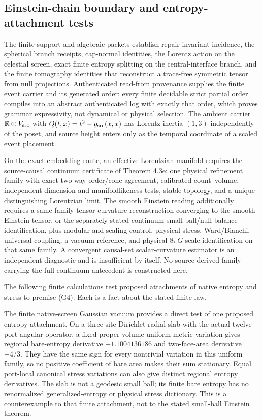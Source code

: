 \subsection{Einstein-chain boundary and entropy-attachment tests}
\label{sec:einstein-chain-boundary}

The finite support and algebraic packets establish repair-invariant incidence, the spherical
branch receipts, cap-normal identities, the Lorentz action on the celestial screen, exact finite
entropy splitting on the central-interface branch, and the finite tomography identities that
reconstruct a trace-free symmetric tensor from null projections. Authenticated read-from
provenance supplies the finite event carrier and its generated order; every finite decidable
strict partial order compiles into an abstract authenticated log with exactly that order, which
proves grammar expressivity, not dynamical or physical selection. The ambient carrier
\(\mathbb R\oplus V_{\rm src}\) with \(Q(t,x)=t^2-g_{\rm src}(x,x)\) has Lorentz inertia
\((1,3)\) independently of the poset, and source height enters only as the temporal coordinate
of a scaled event placement.

On the exact-embedding route, an effective Lorentzian manifold requires the source-causal
continuum certificate of Theorem 4.3e: one physical refinement family with
exact two-way order/cone agreement, calibrated count--volume, independent
dimension and manifoldlikeness tests, stable topology, and a unique
distinguishing Lorentzian limit. The smooth Einstein reading additionally
requires a same-family tensor-curvature reconstruction converging to the
smooth Einstein tensor, or the separately stated continuum
small-ball/null-balance identification, plus modular and scaling control,
physical stress, Ward/Bianchi, universal coupling, a vacuum reference, and
physical \(8\pi G\) scale identification on that same family. A convergent
causal-set scalar-curvature estimator is an independent diagnostic and is
insufficient by itself. No source-derived family carrying the full
continuum antecedent is constructed here.

The following finite calculations test proposed attachments of native entropy and stress to
premise (G4). Each is a fact about the stated finite law.

The finite native-screen Gaussian vacuum provides a direct test of one
proposed entropy attachment. On a three-site Dirichlet radial slab with the
actual twelve-port angular operator, a fixed-proper-volume uniform metric
variation gives regional bare-entropy derivative \(-1.1004136186\) and
two-face-area derivative \(-4/3\). They have the same sign for every
nontrivial variation in this uniform family, so no positive coefficient of
bare area makes their sum stationary. Equal port-local canonical stress
variations can also give distinct regional entropy derivatives. The slab is
not a geodesic small ball; its finite bare entropy has no renormalized
generalized-entropy or physical stress dictionary. This is a counterexample
to that finite attachment, not to the stated small-ball Einstein theorem.

